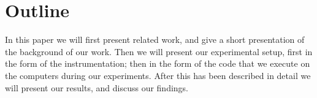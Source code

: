 
\section{Outline}
In this paper we will first present related work, and give a short presentation of the background of our work.
Then we will present our experimental setup, first in the form of the instrumentation; then in the form of the code that we execute on the computers during our experiments.
After this has been described in detail we will present our results, and discuss our findings.
